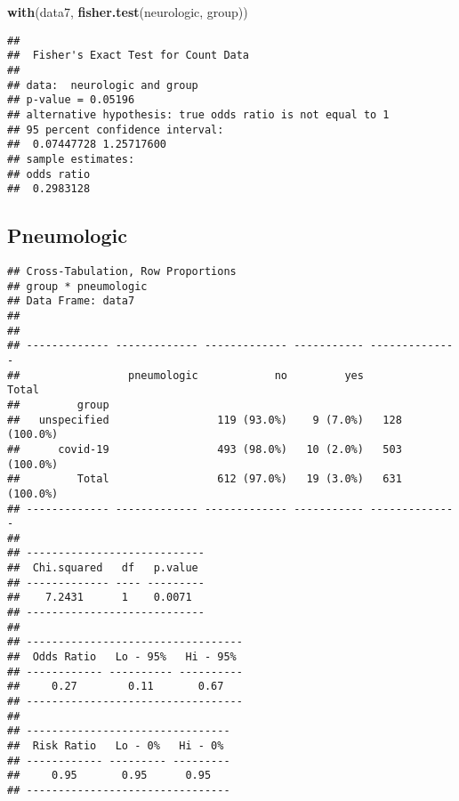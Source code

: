 \documentclass[
]{article}
\newenvironment{Shaded}{\begin{snugshade}}{\end{snugshade}}
\newcommand{\DataTypeTok}[1]{\textcolor[rgb]{0.13,0.29,0.53}{#1}}
\newcommand{\KeywordTok}[1]{\textcolor[rgb]{0.13,0.29,0.53}{\textbf{#1}}}
\newcommand{\NormalTok}[1]{#1}
\newcommand{\OperatorTok}[1]{\textcolor[rgb]{0.81,0.36,0.00}{\textbf{#1}}}
\newcommand{\OtherTok}[1]{\textcolor[rgb]{0.56,0.35,0.01}{#1}}
\newcommand{\StringTok}[1]{\textcolor[rgb]{0.31,0.60,0.02}{#1}}
\begin{document}
\begin{Shaded}
\begin{Highlighting}[]
\KeywordTok{with}\NormalTok{(data7, }\KeywordTok{fisher.test}\NormalTok{(neurologic, group))}
\end{Highlighting}
\end{Shaded}

\begin{verbatim}
## 
##  Fisher's Exact Test for Count Data
## 
## data:  neurologic and group
## p-value = 0.05196
## alternative hypothesis: true odds ratio is not equal to 1
## 95 percent confidence interval:
##  0.07447728 1.25717600
## sample estimates:
## odds ratio 
##  0.2983128
\end{verbatim}

\hypertarget{pneumologic}{%
\subsection{Pneumologic}\label{pneumologic}}

\begin{Shaded}
\end{Shaded}

\begin{verbatim}
## Cross-Tabulation, Row Proportions  
## group * pneumologic  
## Data Frame: data7  
## 
## 
## ------------- ------------- ------------- ----------- --------------
##                 pneumologic            no         yes          Total
##         group                                                       
##   unspecified                 119 (93.0%)    9 (7.0%)   128 (100.0%)
##      covid-19                 493 (98.0%)   10 (2.0%)   503 (100.0%)
##         Total                 612 (97.0%)   19 (3.0%)   631 (100.0%)
## ------------- ------------- ------------- ----------- --------------
## 
## ----------------------------
##  Chi.squared   df   p.value 
## ------------- ---- ---------
##    7.2431      1    0.0071  
## ----------------------------
## 
## ----------------------------------
##  Odds Ratio   Lo - 95%   Hi - 95% 
## ------------ ---------- ----------
##     0.27        0.11       0.67   
## ----------------------------------
## 
## --------------------------------
##  Risk Ratio   Lo - 0%   Hi - 0% 
## ------------ --------- ---------
##     0.95       0.95      0.95   
## --------------------------------
\end{verbatim}
\end{document}
